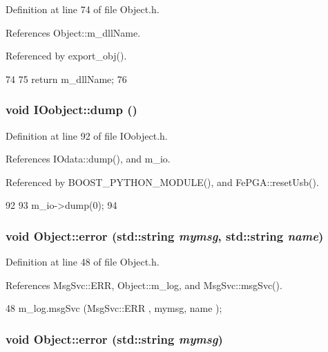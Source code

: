 Definition at line 74 of file Object.h.

References Object::m\_\-dllName.

Referenced by export\_\-obj().


\begin{DoxyCode}
74                        {
75     return m_dllName;
76   }  
\end{DoxyCode}
\hypertarget{classIOobject_a1247f08c84c1732a76caf07e987871e9}{
\subsubsection[{dump}]{\setlength{\rightskip}{0pt plus 5cm}void IOobject::dump ()}}
\label{classIOobject_a1247f08c84c1732a76caf07e987871e9}


Definition at line 92 of file IOobject.h.

References IOdata::dump(), and m\_\-io.

Referenced by BOOST\_\-PYTHON\_\-MODULE(), and FePGA::resetUsb().


\begin{DoxyCode}
92              {
93     m_io->dump(0);
94   }
\end{DoxyCode}
\hypertarget{classObject_ad7f6c457733082efa2f9ff5f5c8e119a}{
\subsubsection[{error}]{\setlength{\rightskip}{0pt plus 5cm}void Object::error (std::string {\em mymsg}, \/  std::string {\em name})}}
\label{classObject_ad7f6c457733082efa2f9ff5f5c8e119a}


Definition at line 48 of file Object.h.

References MsgSvc::ERR, Object::m\_\-log, and MsgSvc::msgSvc().


\begin{DoxyCode}
48 { m_log.msgSvc (MsgSvc::ERR     , mymsg, name ); }
\end{DoxyCode}
\hypertarget{classObject_a204a95f57818c0f811933917a30eff45}{
\subsubsection[{error}]{\setlength{\rightskip}{0pt plus 5cm}void Object::error (std::string {\em mymsg})}}
\label{classObject_a204a95f57818c0f811933917a30eff45}


